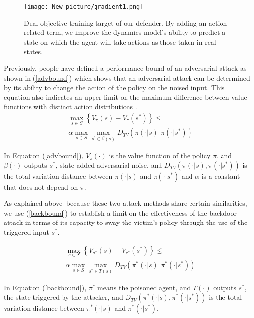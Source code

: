 \documentclass[letterpaper, 10 pt, conference]{ieeeconf}  %
\begin{document}
\begin{figure}
    \centering
    \texttt{[image: New\_picture/gradient1.png]}
    \caption{Dual-objective training target of our defender. By adding an action related-term, we improve the dynamics model's ability to predict a state on which the agent will take actions as those taken in real states.}
    \label{fig:dual-gradient}
\end{figure}

Previously, people have defined a performance bound of an adversarial attack as shown in (\ref{advbound}) which shows that an adversarial attack can be determined by its ability to change the action of the policy on the noised input. This equation also indicates an upper limit on the maximum difference between value functions with distinct action distributions \cite{vulnerabilitypolicy}.
\begin{equation}\label{advbound}
\begin{aligned} 
&\max _{s \in S}\left\{V_{\pi}(s)-V_{\pi}(s^*)\right\} \leq \\ &\alpha \max _{s \in S}\max _{s^* \in \beta(s)} D_{TV}(\pi(\cdot| s), \pi (\cdot| s^*))
\end{aligned}
\end{equation}

In Equation (\ref{advbound}), $V_\pi(\cdot)$ is the value function of the policy $\pi$, and $\beta(\cdot)$ outputs $s^*$, state added adversarial noise, and $D_{TV}(\pi(\cdot| s), \pi (\cdot| s^*))$ is the total variation distance between $\pi(\cdot| s)$ and $\pi (\cdot| s^*)$ and $\alpha$ is a constant that does not depend on $\pi$.

As explained above, because these two attack methods share certain similarities, we use (\ref{backbound}) to establish a limit on the effectiveness of the backdoor attack in terms of its capacity to sway the victim's policy through the use of the triggered input $s^*$.

\begin{equation}\label{backbound}
\begin{aligned}
   &\max _{s \in S}\left\{V_{\pi^*}(s)-V_{\pi^*}(s^*)\right\} \leq \\ &\alpha \max _{s \in S}\max _{s^* \in T(s)} D_{TV}(\pi^*(\cdot| s), \pi^* (\cdot| s^*)) 
\end{aligned}
\end{equation}

In Equation (\ref{backbound}), $\pi^*$ means the poisoned agent, and $T(\cdot)$ outputs $s^*$, the state triggered by the attacker, and $D_{TV}(\pi^*(\cdot| s), \pi^* (\cdot| s^*))$ is the total variation distance between $\pi^*(\cdot| s)$ and $\pi^* (\cdot| s^*)$.
\end{document}

